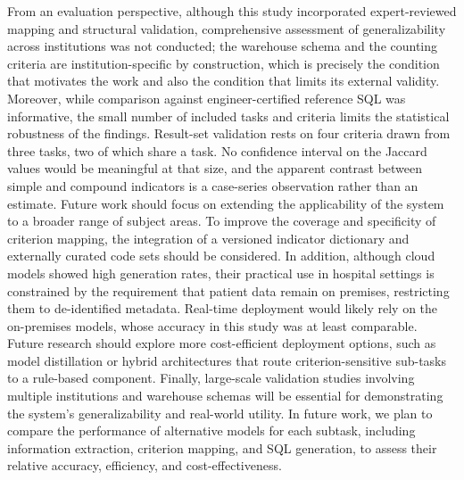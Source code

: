 \documentclass[10pt]{article}
\begin{document}
From an evaluation perspective, although this study incorporated expert-reviewed mapping and structural validation, comprehensive assessment of generalizability across institutions was not conducted; the warehouse schema and the counting criteria
are institution-specific by construction, which is precisely the condition that
motivates the work and also the condition that limits its external validity.
Moreover, while comparison against engineer-certified reference SQL was informative, the small number of included tasks and criteria limits the statistical robustness of the findings. Result-set validation rests on four criteria drawn from three tasks, two of which share a task. No confidence interval on the Jaccard values would be meaningful at that size, and the apparent contrast between simple and compound indicators is a case-series observation rather than an estimate. Future work should focus on extending
the applicability of the system to a broader range of subject areas. To improve
the coverage and specificity of criterion mapping, the integration of a
versioned indicator dictionary and externally curated code sets should be
considered. In addition, although cloud models showed high generation rates,
their practical use in hospital settings is constrained by the requirement that
patient data remain on premises, restricting them to de-identified metadata.
Real-time deployment would likely rely on the on-premises models, whose accuracy
in this study was at least comparable. Future research should explore more
cost-efficient deployment options, such as model distillation or hybrid
architectures that route criterion-sensitive sub-tasks to a rule-based
component. Finally, large-scale validation studies involving multiple
institutions and warehouse schemas will be essential for demonstrating the
system's generalizability and real-world utility. In future work, we plan to
compare the performance of alternative models for each subtask, including
information extraction, criterion mapping, and SQL generation, to assess their
relative accuracy, efficiency, and cost-effectiveness.
\end{document}
